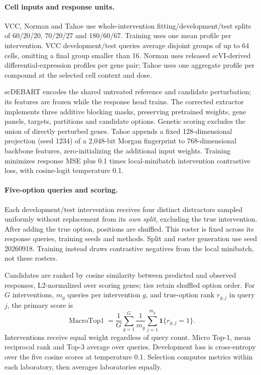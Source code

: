 \paragraph{Cell inputs and response units.}
VCC, Norman and Tahoe use whole-intervention fitting/development/test splits of 60/20/20, 70/20/27 and 180/60/67. Training uses one mean profile per intervention. VCC development/test queries average disjoint groups of up to 64 cells, omitting a final group smaller than 16. Norman uses released scVI-derived differential-expression profiles per gene pair; Tahoe uses one aggregate profile per compound at the selected cell context and dose.

scDEBART encodes the shared untreated reference and candidate perturbation; its features are frozen while the response head trains. The corrected extractor implements three additive blocking masks, preserving pretrained weights, gene panels, targets, partitions and candidate options. Genetic scoring excludes the union of directly perturbed genes. Tahoe appends a fixed 128-dimensional projection (seed 1234) of a 2,048-bit Morgan fingerprint to 768-dimensional backbone features, zero-initializing the additional input weights. Training minimizes response MSE plus 0.1 times local-minibatch intervention contrastive loss, with cosine-logit temperature 0.1.

\paragraph{Five-option queries and scoring.}
Each development/test intervention receives four distinct distractors sampled uniformly without replacement from its \emph{own split}, excluding the true intervention. After adding the true option, positions are shuffled. This roster is fixed across its response queries, training seeds and methods. Split and roster generation use seed 20260918. Training instead draws contrastive negatives from the local minibatch, not these rosters.

Candidates are ranked by cosine similarity between predicted and observed responses, L2-normalized over scoring genes; ties retain shuffled option order. For $G$ interventions, $m_g$ queries per intervention $g$, and true-option rank $r_{g,j}$ in query $j$, the primary score is
\[
\operatorname{MacroTop1}=\frac{1}{G}\sum_{g=1}^{G}\frac{1}{m_g}
\sum_{j=1}^{m_g}\mathbf{1}\{r_{g,j}=1\}.
\]
Interventions receive equal weight regardless of query count. Micro Top-1, mean reciprocal rank and Top-3 average over queries. Development loss is cross-entropy over the five cosine scores at temperature 0.1. Selection computes metrics within each laboratory, then averages laboratories equally.

